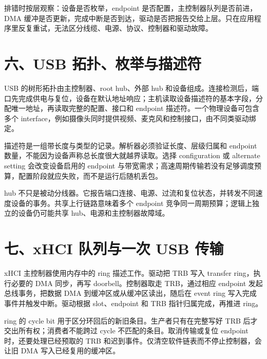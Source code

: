 排错时按层观察：设备是否枚举，endpoint 是否配置，主控制器队列是否前进，DMA 缓冲是否更新，完成中断是否到达，驱动是否把报告交给上层。只在应用程序里反复重试，无法区分线缆、电源、协议、控制器和驱动故障。

\section{六、USB 拓扑、枚举与描述符}

USB 的树形拓扑由主控制器、root hub、外部 hub 和设备组成。连接检测后，端口先完成供电与复位，设备在默认地址响应；主机读取设备描述符的基本字段，分配唯一地址，再读取完整的配置、接口和 endpoint 描述符。一个物理设备可包含多个 interface，例如摄像头同时提供视频、麦克风和控制接口，由不同类驱动绑定。

描述符是一组带长度与类型的记录。解析器必须验证长度、层级归属和 endpoint 数量，不能因为设备声称总长度很大就越界读取。选择 configuration 或 alternate setting 会改变设备启用的 endpoint 与带宽需求；高速周期传输若没有足够调度预算，配置阶段就应失败，而不是运行后随机丢包。

hub 不只是被动分线器。它报告端口连接、电源、过流和复位状态，并转发不同速度设备的事务。共享上行链路意味着多个 endpoint 竞争同一周期预算；逻辑上独立的设备仍可能共享 hub、电源和主控制器故障域。

\section{七、xHCI 队列与一次 USB 传输}

xHCI 主控制器使用内存中的 ring 描述工作。驱动把 TRB 写入 transfer ring，执行必要的 DMA 同步，再写 doorbell。控制器取走 TRB，通过相应 endpoint 发起总线事务，把数据 DMA 到缓冲区或从缓冲区读出，随后在 event ring 写入完成事件并触发中断。驱动根据 slot、endpoint 和 TRB 指针归属完成，再推进 ring。

ring 的 cycle bit 用于区分环回后的新旧条目。生产者只有在完整写好 TRB 后才交出所有权；消费者不能跨过 cycle 不匹配的条目。取消传输或复位 endpoint 时，还要处理已经预取的 TRB 和迟到事件。仅清空软件链表而不停止控制器，会让旧 DMA 写入已经复用的缓冲区。


